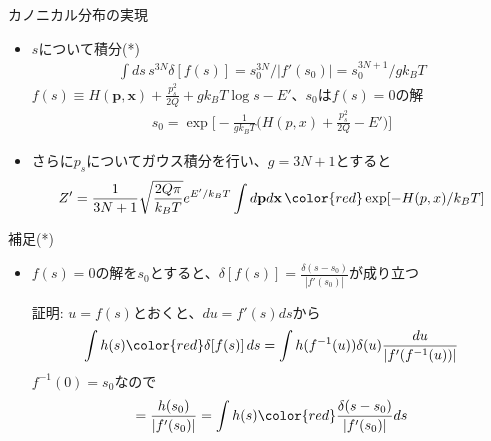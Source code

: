 \documentclass[dvipdfmx]{beamer}
\begin{document}
\begin{frame}[t,fragile]{カノニカル分布の実現}
  \begin{itemize}
  \item $s$について積分(*)
    \begin{align*}
      \int ds \, s^{3N} \delta[f(s)] = s_0^{3N} / | f'(s_0) | = s_0^{3N+1} / g k_B T
    \end{align*}
    $f(s) \equiv H(\mathbf{p},\mathbf{x}) + \frac{p_s^2}{2Q} + g k_B T \log s - E'$、$s_0$は$f(s)=0$の解
    \begin{align*}
      s_0 = \exp \Big[ -\frac{1}{gk_BT} \Big( H(p,x) + \frac{p_s^2}{2Q} - E' \Big) \Big]
    \end{align*}
  \item さらに$p_s$についてガウス積分を行い、$g=3N+1$とすると
    \begin{align*}
      Z' = \frac{1}{3N+1} \sqrt{\frac{2Q\pi}{k_BT}} e^{E'/k_BT} \int d\mathbf{p}d\mathbf{x} \, {\color{red}\exp [- H(p,x)/k_BT ]}
    \end{align*}
  \end{itemize}
\end{frame}

\begin{frame}[t,fragile]{補足(*)}
  \begin{itemize}
  \item $f(s)=0$の解を$s_0$とすると、$\displaystyle \delta [f(s)] = \frac{\delta(s-s_0)}{|f'(s_0)|}$が成り立つ

    証明: $u=f(s)$とおくと、$du = f'(s)ds$から
    \begin{align*}
      \int h(s) {\color{red}\delta [f(s)]} \, ds= \int h(f^{-1}(u)) \delta(u) \frac{du}{|f'(f^{-1}(u))|}
    \end{align*}
    $f^{-1}(0)=s_0$なので
    \begin{align*}
      = \frac{h(s_0)}{|f'(s_0)|} = \int h(s) {\color{red}\frac{\delta(s-s_0)}{|f'(s_0)|}} ds
    \end{align*}
  \end{itemize}
\end{frame}
\end{document}
